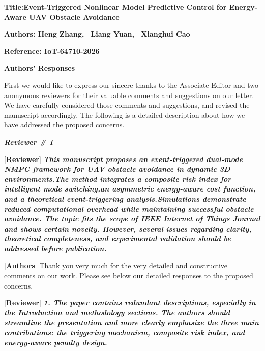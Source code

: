 \documentclass[12pt, twosides]{article}
\theoremstyle{definition}
\begin{document}
\bigskip


\noindent \textbf{Title:Event-Triggered Nonlinear Model Predictive Control for Energy-Aware UAV Obstacle Avoidance}

\noindent \textbf{Authors: Heng Zhang, ~Liang Yuan, ~Xianghui Cao}

\noindent \textbf{Reference:  IoT-64710-2026}

\bigskip

\begin{center}
\textbf{\LARGE Authors' Responses}
\end{center}

\bigskip First we would like to express our sincere thanks to the Associate Editor and two anonymous reviewers for their valuable comments and suggestions on our letter. We have carefully considered those comments and suggestions, and revised the manuscript accordingly. The following is a detailed description about how we have addressed the proposed concerns.

\begin{center}
\textbf{\textit{\large Reviewer \# 1}}
\end{center}

\textcolor[rgb]{0.00,0.00,1.00}{[\textbf {Reviewer}]} \textit{\textbf{This manuscript proposes an event-triggered dual-mode NMPC framework for UAV obstacle avoidance in dynamic 3D environments.The method integrates a composite risk index for intelligent mode switching,an asymmetric energy-aware cost function, and a theoretical event-triggering analysis.Simulations demonstrate reduced computational overhead while maintaining successful obstacle avoidance. The topic fits the scope of IEEE Internet of Things Journal and shows certain novelty. However, several issues regarding clarity, theoretical completeness, and experimental validation should be addressed before publication.}}

\textcolor[rgb]{0.00,0.00,1.00}{[\textbf{Authors}]} Thank you very much for the very detailed and constructive comments on our work. Please see below our detailed responses to the proposed concerns.

\textcolor[rgb]{0.00,0.00,1.00}{[\textbf {Reviewer}]} \textit{\textbf{1. The paper contains redundant descriptions, especially in the Introduction and methodology sections. The authors should streamline the presentation and more clearly emphasize the three main contributions: the triggering mechanism, composite risk index, and energy-aware penalty design.}}
\end{document}
